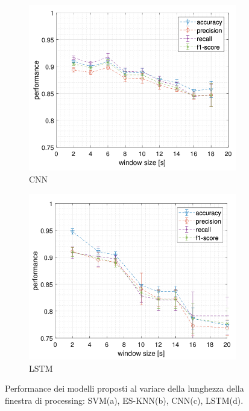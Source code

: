 \begin{figure}[!htb]
\begin{subfigure}{.45\textwidth}
        \includegraphics[width=\textwidth]{figure/cnn_window.png}
        \caption{CNN}
        \label{fig:window:cnn}
    \end{subfigure}
    \begin{subfigure}{.45\textwidth}
        \includegraphics[width=\textwidth]{figure/lstm_window.png}
        \caption{LSTM}
        \label{fig:window:lstm}
    \end{subfigure}
    \caption{Performance dei modelli proposti al variare della lunghezza della finestra di processing: SVM(a), ES-KNN(b), CNN(c), LSTM(d).}
    \label{fig:window}
\end{figure}

